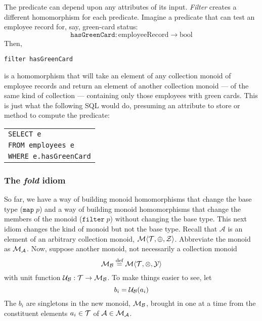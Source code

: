 The predicate can depend upon any attributes of its input. \emph{Filter} creates a different homomorphism for each predicate. Imagine a predicate that can test an employee record for, say, green-card status: \[\mathtt{hasGreenCard}:
\text{employeeRecord}\rightarrow\text{bool}\]
Then,
\begin{center}
\verb"filter hasGreenCard"
\end{center}
is a homomorphism that will take an element of any collection monoid of employee records and return an element of another collection monoid --- of the same kind of collection --- containing only those employees with green cards. This is just what the following SQL would do, presuming an attribute to store or method to compute the predicate:
\begin{center}
\begin{tabular}{l}
\verb"SELECT e"\\
\verb"FROM employees e"\\
\verb"WHERE e.hasGreenCard"
\end{tabular}
\end{center}


\subsubsection{\color{red}The \emph{fold} idiom}


So far, we have a way of building monoid homomorphisms that change the base type ($\mathtt{map}\;p$) and a way of building monoid homomorphisms that change the members of the monoid ($\mathtt{filter}\;p$) without changing the base type. This next idiom changes the kind of monoid but not the base type. Recall that $\mathcal{A}$ is an element of an arbitrary collection monoid, $\mathcal{M}\langle{\mathcal{T}},{\oplus},{\mathcal{Z}}\rangle$. Abbreviate the monoid as $\mathcal{M}_{\mathcal{A}}$. Now, suppose another monoid, not necessarily a collection monoid $$\mathcal{M}_{\mathcal{B}}\overset{\text{def}}{=}\mathcal{M}\langle{\mathcal{T}},{\otimes},{\mathcal{Y}}\rangle$$
with unit function $\mathcal{U}_{\mathcal{B}}:\mathcal{T}\rightarrow\mathcal{M}_{\mathcal{B}}$. To make things easier to see, let
\begin{equation}
  b_i = \mathcal{U}_{\mathcal{B}}(a_i)
  \label{eqn:monadunit}
\end{equation}
The $b_i$ are singletons in the new monoid, $\mathcal{M}_{\mathcal{B}}$, brought in one at a time from the constituent elements $a_i\in\mathcal{T}$ of $\mathcal{A}\in\mathcal{M}_{\mathcal{A}}$.


